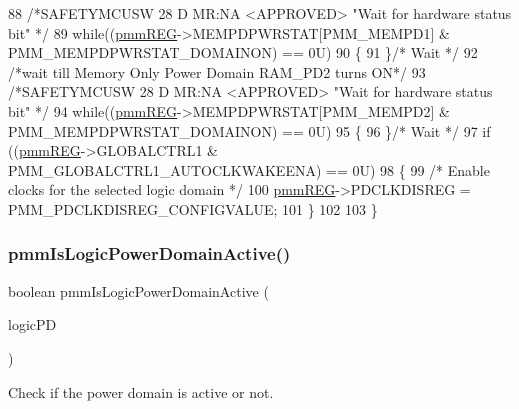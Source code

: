 \begin{DoxyCode}
88     \textcolor{comment}{/*SAFETYMCUSW 28 D MR:NA <APPROVED> "Wait for hardware status bit" */}
89     \textcolor{keywordflow}{while}((\mbox{\hyperlink{reg__pmm_8h_a57b193bea1bf1951b97bdfee07f48598}{pmmREG}}->MEMPDPWRSTAT[PMM\_MEMPD1] & PMM\_MEMPDPWRSTAT\_DOMAINON) == 0U)
90     \{ 
91     \}\textcolor{comment}{/* Wait */}  
92     \textcolor{comment}{/*wait till Memory Only Power Domain RAM\_PD2 turns ON*/}
93     \textcolor{comment}{/*SAFETYMCUSW 28 D MR:NA <APPROVED> "Wait for hardware status bit" */}
94     \textcolor{keywordflow}{while}((\mbox{\hyperlink{reg__pmm_8h_a57b193bea1bf1951b97bdfee07f48598}{pmmREG}}->MEMPDPWRSTAT[PMM\_MEMPD2] & PMM\_MEMPDPWRSTAT\_DOMAINON) == 0U)
95     \{ 
96     \}\textcolor{comment}{/* Wait */}  
97     \textcolor{keywordflow}{if} ((\mbox{\hyperlink{reg__pmm_8h_a57b193bea1bf1951b97bdfee07f48598}{pmmREG}}->GLOBALCTRL1 & PMM\_GLOBALCTRL1\_AUTOCLKWAKEENA) == 0U)
98     \{
99         \textcolor{comment}{/* Enable clocks for the selected logic domain */}
100         \mbox{\hyperlink{reg__pmm_8h_a57b193bea1bf1951b97bdfee07f48598}{pmmREG}}->PDCLKDISREG = PMM\_PDCLKDISREG\_CONFIGVALUE;
101     \}
102 
103 \}
\end{DoxyCode}
\mbox{\label{group__PMM_ga9a7b3cc1f08a5e0a0e1c39f53f8ea709}} 
\subsubsection{\texorpdfstring{pmm\+Is\+Logic\+Power\+Domain\+Active()}{pmmIsLogicPowerDomainActive()}}
{\footnotesize\ttfamily boolean pmm\+Is\+Logic\+Power\+Domain\+Active (\begin{DoxyParamCaption}\item[{pmm\+\_\+\+Logic\+P\+D\+\_\+t}]{logic\+PD }\end{DoxyParamCaption})}



Check if the power domain is active or not. 


